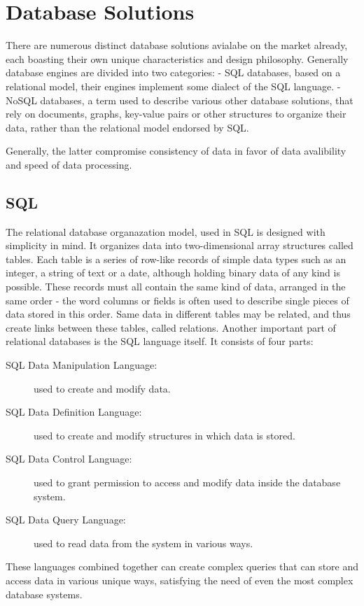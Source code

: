 \chapter{Database Solutions}
\label{ch:background}
There are numerous distinct database solutions avialabe on the market already, each boasting their own unique characteristics and design philosophy. Generally database engines are divided into two categories:
- SQL databases, based on a relational model, their engines implement some dialect of the SQL language.
- NoSQL databases, a term used to describe various other database solutions, that rely on documents, graphs, key-value pairs or other structures to organize their data, rather than the relational model endorsed by SQL.

Generally, the latter compromise consistency of data in favor of data avalibility and speed of data processing.

%
%
\section{SQL}
\label{sec:background:first_section}
The relational database organazation model, used in SQL is designed with simplicity in mind. It organizes data into two-dimensional array structures called tables. Each table is a series of row-like records of simple data types such as an integer, a string of text or a date, although holding binary data of any kind is possible. These records must all contain the same kind of data, arranged in the same order - the word columns or fields is often used to describe single pieces of data stored in this order. Same data in different tables may be related, and thus create links between these tables, called relations.
Another important part of relational databases is the SQL language itself. It consists of four parts:
\begin{description}
  \item[SQL Data Manipulation Language:] used to create and modify data.
  \item[SQL Data Definition Language:] used to create and modify structures in which data is stored.
  \item[SQL Data Control Language:] used to grant permission to access and modify data inside the database system.
  \item[SQL Data Query Language:] used to read data from the system in various ways.
\end{description}
These languages combined together can create complex queries that can store and access data in various unique ways, satisfying the need of even the most complex database systems.

